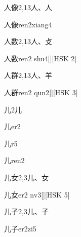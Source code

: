 \begin{entry}{人像}{2,13}{⼈、⼈}
  \begin{phonetics}{人像}{ren2xiang4}
  \end{phonetics}
\end{entry}

\begin{entry}{人数}{2,13}{⼈、⽁}
  \begin{phonetics}{人数}{ren2 shu4}[][HSK 2]
  \end{phonetics}
\end{entry}

\begin{entry}{人群}{2,13}{⼈、⽺}
  \begin{phonetics}{人群}{ren2 qun2}[][HSK 3]
  \end{phonetics}
\end{entry}

\begin{entry}{儿}{2}{⼉}
  \begin{phonetics}{儿}{er2}
  \end{phonetics}
  \begin{phonetics}{儿}{r5}
  \end{phonetics}
  \begin{phonetics}{儿}{ren2}
  \end{phonetics}
\end{entry}

\begin{entry}{儿女}{2,3}{⼉、⼥}
  \begin{phonetics}{儿女}{er2 nv3}[][HSK 5]
  \end{phonetics}
\end{entry}

\begin{entry}{儿子}{2,3}{⼉、⼦}
  \begin{phonetics}{儿子}{er2zi5}
  \end{phonetics}
\end{entry}

